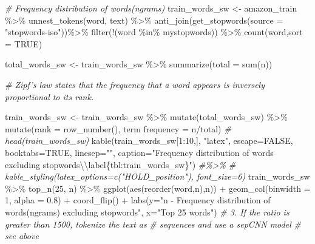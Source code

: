\documentclass[
]{article}
\newenvironment{Shaded}{}{}
\newcommand{\AttributeTok}[1]{\textcolor[rgb]{0.49,0.56,0.16}{#1}}
\newcommand{\CommentTok}[1]{\textcolor[rgb]{0.38,0.63,0.69}{\textit{#1}}}
\newcommand{\ConstantTok}[1]{\textcolor[rgb]{0.53,0.00,0.00}{#1}}
\newcommand{\DecValTok}[1]{\textcolor[rgb]{0.25,0.63,0.44}{#1}}
\newcommand{\FloatTok}[1]{\textcolor[rgb]{0.25,0.63,0.44}{#1}}
\newcommand{\FunctionTok}[1]{\textcolor[rgb]{0.02,0.16,0.49}{#1}}
\newcommand{\NormalTok}[1]{#1}
\newcommand{\OtherTok}[1]{\textcolor[rgb]{0.00,0.44,0.13}{#1}}
\newcommand{\SpecialCharTok}[1]{\textcolor[rgb]{0.25,0.44,0.63}{#1}}
\newcommand{\StringTok}[1]{\textcolor[rgb]{0.25,0.44,0.63}{#1}}
\begin{document}
\begin{Shaded}
\begin{Highlighting}[]
\CommentTok{\# Frequency distribution of words(ngrams)}
\NormalTok{train\_words\_sw }\OtherTok{\textless{}{-}}\NormalTok{ amazon\_train }\SpecialCharTok{\%\textgreater{}\%} \FunctionTok{unnest\_tokens}\NormalTok{(word, text) }\SpecialCharTok{\%\textgreater{}\%}
    \FunctionTok{anti\_join}\NormalTok{(}\FunctionTok{get\_stopwords}\NormalTok{(}\AttributeTok{source =} \StringTok{"stopwords{-}iso"}\NormalTok{))}\SpecialCharTok{\%\textgreater{}\%}
    \FunctionTok{filter}\NormalTok{(}\SpecialCharTok{!}\NormalTok{(word }\SpecialCharTok{\%in\%}\NormalTok{ mystopwords)) }\SpecialCharTok{\%\textgreater{}\%}
    \FunctionTok{count}\NormalTok{(word,}\AttributeTok{sort =} \ConstantTok{TRUE}\NormalTok{)}

\NormalTok{total\_words\_sw }\OtherTok{\textless{}{-}}\NormalTok{ train\_words\_sw }\SpecialCharTok{\%\textgreater{}\%}
    \FunctionTok{summarize}\NormalTok{(}\AttributeTok{total =} \FunctionTok{sum}\NormalTok{(n))}

\CommentTok{\# Zipf’s law states that the frequency that a word appears is inversely proportional to its rank.}

\NormalTok{train\_words\_sw }\OtherTok{\textless{}{-}}\NormalTok{ train\_words\_sw }\SpecialCharTok{\%\textgreater{}\%}
    \FunctionTok{mutate}\NormalTok{(total\_words\_sw) }\SpecialCharTok{\%\textgreater{}\%}
     \FunctionTok{mutate}\NormalTok{(}\AttributeTok{rank =} \FunctionTok{row\_number}\NormalTok{(),}
         \StringTok{\textasciigrave{}}\AttributeTok{term frequency}\StringTok{\textasciigrave{}} \OtherTok{=}\NormalTok{ n}\SpecialCharTok{/}\NormalTok{total)}
\CommentTok{\# head(train\_words\_sw)}
\FunctionTok{kable}\NormalTok{(train\_words\_sw[}\DecValTok{1}\SpecialCharTok{:}\DecValTok{10}\NormalTok{,], }\StringTok{"latex"}\NormalTok{, }\AttributeTok{escape=}\ConstantTok{FALSE}\NormalTok{, }\AttributeTok{booktabs=}\ConstantTok{TRUE}\NormalTok{, }\AttributeTok{linesep=}\StringTok{""}\NormalTok{, }\AttributeTok{caption=}\StringTok{"Frequency distribution of words excluding stopwords}\SpecialCharTok{\textbackslash{}\textbackslash{}}\StringTok{label\{tbl:train\_words\_sw\}"}\NormalTok{) }\CommentTok{\#\%\textgreater{}\%}
    \CommentTok{\# kable\_styling(latex\_options=c("HOLD\_position"), font\_size=6)}
\NormalTok{train\_words\_sw }\SpecialCharTok{\%\textgreater{}\%}
  \FunctionTok{top\_n}\NormalTok{(}\DecValTok{25}\NormalTok{, n) }\SpecialCharTok{\%\textgreater{}\%}
  \FunctionTok{ggplot}\NormalTok{(}\FunctionTok{aes}\NormalTok{(}\FunctionTok{reorder}\NormalTok{(word,n),n)) }\SpecialCharTok{+}
  \FunctionTok{geom\_col}\NormalTok{(}\AttributeTok{binwidth =} \DecValTok{1}\NormalTok{, }\AttributeTok{alpha =} \FloatTok{0.8}\NormalTok{) }\SpecialCharTok{+}
   \FunctionTok{coord\_flip}\NormalTok{() }\SpecialCharTok{+}
  \FunctionTok{labs}\NormalTok{(}\AttributeTok{y=}\StringTok{"n {-} Frequency distribution of words(ngrams) excluding stopwords"}\NormalTok{,}
       \AttributeTok{x=}\StringTok{"Top 25 words"}\NormalTok{)}
\CommentTok{\# 3. If the ratio is greater than 1500, tokenize the text as}
\CommentTok{\# sequences and use a sepCNN model}
\CommentTok{\#    see above}


\end{Highlighting}
\end{Shaded}
\end{document}
